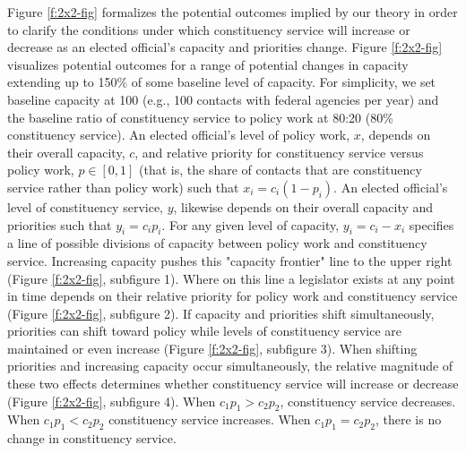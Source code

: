 \documentclass[12pt]{article}
\begin{document}
{Figure \ref{f:2x2-fig} formalizes the potential outcomes implied by our theory in order to clarify the conditions under which constituency service will increase or decrease as an elected official's capacity and priorities change. 
Figure \ref{f:2x2-fig} visualizes potential outcomes for a range of potential changes in capacity extending up to 150\% of some baseline level of capacity. For simplicity, we set baseline capacity at 100 (e.g., 100 contacts with federal agencies per year) and the baseline ratio of constituency service to policy work at 80:20 (80\% constituency service).
An elected official's level of policy work, $x$, depends on their overall capacity, $c$, and relative priority for constituency service versus policy work, $p \in [0, 1]$ (that is, the share of contacts that are constituency service rather than policy work) such that $x_i = c_i (1-p_i)$.
An elected official's level of constituency service, $y$, likewise depends on their overall capacity and priorities such that $y_i = c_i p_i$.
For any given level of capacity, $y_i = c_i-x_i$ specifies a line of possible divisions of capacity between policy work and constituency service. Increasing capacity pushes this "capacity frontier" line to the upper right (Figure \ref{f:2x2-fig}, subfigure 1). Where on this line a legislator exists at any point in time depends on their relative priority for policy work and constituency service (Figure \ref{f:2x2-fig}, subfigure 2). If capacity and priorities shift simultaneously, priorities can shift toward policy while levels of constituency service are maintained or even increase (Figure \ref{f:2x2-fig}, subfigure 3). When shifting priorities and increasing capacity occur simultaneously, the relative magnitude of these two effects determines whether constituency service will increase or decrease (Figure \ref{f:2x2-fig}, subfigure 4).  
When $c_1p_1 > c_2p_2$, constituency service decreases. 
When $c_1p_1 < c_2p_2$ constituency service increases. 
When $c_1p_1 = c_2p_2$, there is no change in constituency service. 

}
\end{document}
